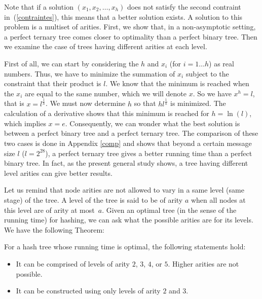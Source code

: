 \documentclass{llncs}
\begin{document}
Note that if a solution $(x_1, x_2 , \ldots, x_h)$ does not satisfy the second contraint in~(\ref{contraintes}), this means that a better solution
exists. A solution to this problem is a multiset of arities.
First, we show that, in a non-asymptotic setting, 
a perfect ternary tree 
comes closer to optimality 
than a perfect binary tree.
Then we examine the case of trees having different arities at each level.



First of all, we can start by considering the $h$ and $x_i$ (for $i=1 \ldots h$) as real numbers. Thus, 
we have to minimize the summation of $x_i$ subject to the constraint that their product is $l$. 
We know that the minimum is reached when the $x_i$
are equal to the same number, which we will denote $x$. So we have
$x^h=l$, that is $x=l^{\frac{1}{h}}$. We must now determine
$h$ so that $h l^{\frac{1}{h}}$ is minimized.
The calculation of a derivative shows that this minimum is reached for $h=\ln(l)$,
which implies $x=e$. 
Consequently, we can wonder what the best solution is between a perfect binary tree and a perfect ternary tree.
The comparison of these two cases is done in Appendix \ref{comp} and shows that
beyond a certain message size $l$ ($l=2^{28}$), a perfect ternary tree gives a better running time than a perfect binary tree.
In fact, as the present general study shows, a tree having different level arities can give better results.





Let us remind that node arities are not allowed to vary in a same level (same stage) of the tree.
A level of the tree is said to be of arity $a$ when all nodes at this level are of arity at most~$a$.
Given an optimal tree (in the sense of the running time) for hashing, we can ask what the possible arities are for its levels. 
We have the following Theorem:

\begin{theorem}\label{arites}
For a hash tree whose running time is optimal, the following statements hold: 
\begin{itemize}
 \item It can be comprised of levels of arity $2$, $3$, $4$, or $5$. Higher arities are not possible.
 \item It can be constructed using only levels of arity $2$ and $3$.
\end{itemize}
\end{theorem}
\end{document}
